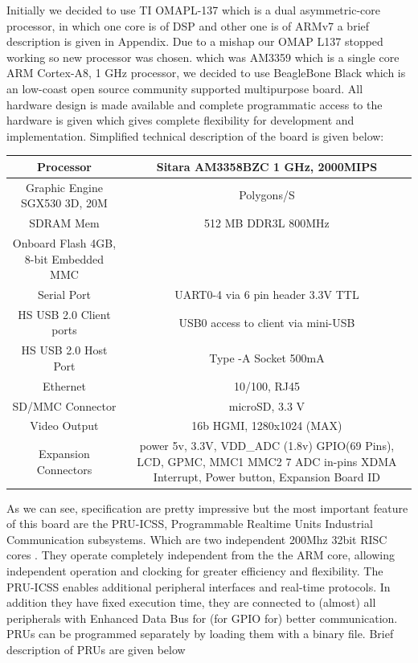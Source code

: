 Initially we decided to use TI OMAPL-137 which is a dual asymmetric-core processor, in which one core is of DSP and other one is of ARMv7 a brief description is given in Appendix. Due to a mishap our OMAP L137 stopped working so new processor was chosen. which was AM3359 which is a single core ARM Cortex-A8, 1 GHz processor, we decided to use BeagleBone Black which is an low-coast open source community supported multipurpose board. All hardware design is made available and complete programmatic access to the hardware is given which gives complete flexibility for development and implementation. Simplified technical description of the board is given below:
\begin{table}[h]
		\begin{center}
			\setlength\arrayrulewidth{1pt}
			\begin{tabular}{|c|c|}
				\hline
				Processor & Sitara AM3358BZC 1 GHz, 2000MIPS\\
				\hline
				Graphic Engine  SGX530 3D, 20M & Polygons/S\\
				\hline
				SDRAM Mem & 512 MB DDR3L 800MHz \\
				\hline
				Onboard Flash 4GB, 8-bit Embedded MMC \\
				\hline
				Serial Port & UART0-4 via 6 pin header 3.3V TTL\\ 
				\hline
				HS USB 2.0 Client ports & USB0 access to client via mini-USB\\
				\hline
				HS USB 2.0 Host Port & Type -A Socket 500mA \\
				\hline
				Ethernet & 10/100, RJ45 \\
				\hline
				SD/MMC Connector & microSD, 3.3 V\\
				\hline
				Video Output & 16b HGMI, 1280x1024 (MAX)\\
				\hline 
				\multirow{3}{10pt}{Expansion Connectors} & power 5v, 3.3V, VDD\_ADC (1.8v) GPIO(69 Pins), LCD, GPMC, MMC1 MMC2 7 ADC in-pins	XDMA Interrupt,
				Power button, Expansion Board ID\\
				\hline
				
			\end{tabular}
		\end{center}
\end{table}

As we can see, specification are pretty impressive but the most important feature of this board are the PRU-ICSS, Programmable Realtime Units Industrial Communication subsystems. Which are two independent 200Mhz 32bit RISC cores . They operate completely independent from the the ARM core,  allowing independent operation and clocking for greater efficiency and flexibility. The PRU-ICSS enables additional peripheral interfaces and real-time protocols. In addition they have fixed execution time, they are connected to (almost) all peripherals with Enhanced Data Bus for (for GPIO for) better communication. PRUs can be programmed separately by loading them with a binary file. Brief description of PRUs are given below

